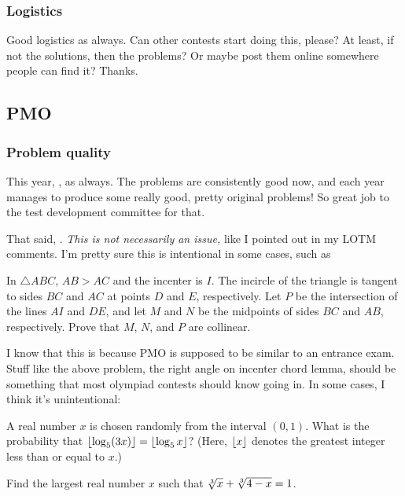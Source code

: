 \documentclass[11pt,paper=letter]{scrartcl}
\begin{document}
\subsubsection*{Logistics}

Good logistics as always.  Can other contests start doing this, please? At least, if not the solutions, then the problems? Or maybe post them online somewhere people can find it? Thanks.

\subsection{PMO}

\subsubsection*{Problem quality}

This year, , as always. The problems are consistently good now, and each year manages to produce some really good, pretty original problems! So great job to the test development committee for that.

That said, . \emph{This is not necessarily an issue,} like I pointed out in my LOTM comments. I'm pretty sure this is intentional in some cases, such as

\begin{probboxed}
  [Areas II2] In $\triangle ABC$, $AB > AC$ and the incenter is $I$. The incircle of the triangle is tangent to sides $BC$ and $AC$ at points $D$ and $E$, respectively. Let $P$ be the intersection of the lines $AI$ and $DE$, and let $M$ and $N$ be the midpoints of sides $BC$ and $AB$, respectively. Prove that $M$, $N$, and $P$ are collinear.
\end{probboxed}

I know that this is because PMO is supposed to be similar to an entrance exam. Stuff like the above problem, the right angle on incenter chord lemma, should be something that most olympiad contests should know going in. In some cases, I think it's unintentional:

\begin{probboxed}
  [Qualifying II9] A real number $x$ is chosen randomly from the interval $(0, 1)$. What is the probability that $\left\lfloor \log_5(3x) \right\rfloor = \left\lfloor \log_5 x \right\rfloor$? (Here, $\left\lfloor x \right\rfloor$ denotes the greatest integer less than or equal to $x$.)
\end{probboxed}
\vspace{-10pt}
\begin{probboxed}
   Find the largest real number $x$ such that $\sqrt[3]{x} + \sqrt[3]{4-x} = 1$.
\end{probboxed}
\end{document}
